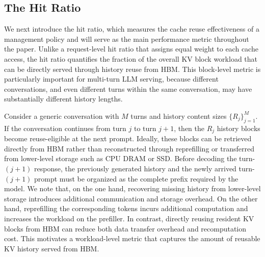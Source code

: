 \documentclass{article}
\theoremstyle{definition}
\begin{document}
\subsection{The  Hit Ratio}
\label{ssec: The  Hit Ratio}


We next introduce the hit ratio, which measures the cache reuse effectiveness of a management policy and will serve as the main performance metric throughout the paper. Unlike a request-level hit ratio that assigns equal weight to each cache access, the hit ratio quantifies the fraction of the overall KV block workload that can be directly served through history reuse from HBM. This block-level metric is particularly important for multi-turn LLM serving, because different conversations, and even different turns within the same conversation, may have substantially different history lengths.

Consider a generic conversation with $M$ turns and history content sizes $\{R_j\}_{j=1}^M$. If the conversation continues from turn $j$ to turn $j+1$, then the $R_j$ history blocks become reuse-eligible at the next prompt. Ideally, these blocks can be retrieved directly from HBM rather than reconstructed through reprefilling or transferred from lower-level storage such as CPU DRAM or SSD. Before decoding the turn-$(j+1)$ response, the previously generated history and the newly arrived turn-$(j+1)$ prompt must be organized as the complete prefix required by the model. We note that, on the one hand, recovering missing history from lower-level storage introduces additional communication and storage overhead. On the other hand, reprefilling the corresponding tokens incurs additional computation and increases the workload on the prefiller. In contrast, directly reusing resident KV blocks from HBM can reduce both data transfer overhead and recomputation cost. This motivates a workload-level metric that captures the amount of reusable KV history served from HBM.
\end{document}
